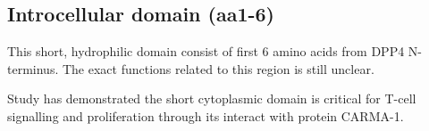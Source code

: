 \subsection{Introcellular domain (aa1-6)}

This short, hydrophilic domain consist of first 6 amino acids from DPP4 N-terminus. The exact functions related to this region is still unclear.

Study has demonstrated the short cytoplasmic domain is critical for T-cell signalling and proliferation through its interact with protein CARMA-1. \cite{Ohnuma_2007}